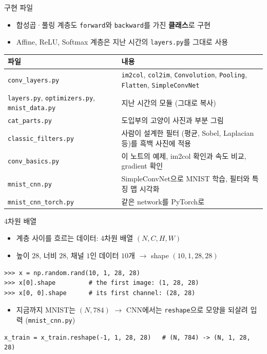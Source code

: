 \documentclass[aspectratio=169,11pt]{beamer}
\begin{document}
\begin{frame}{구현 파일}
\begin{itemize}
\item 합성곱·풀링 계층도 \texttt{forward}와 \texttt{backward}를 가진 \textbf{클래스}로 구현
\item Affine, ReLU, Softmax 계층은 지난 시간의 \texttt{layers.py}를 그대로 사용
\end{itemize}
\vskip2mm
\centering
\small
\begin{tabular}{@{}>{\raggedright\arraybackslash}p{}>{\raggedright\arraybackslash}p{}@{}}
\toprule
파일 & 내용 \\
\midrule
\texttt{conv\_layers.py} & \texttt{im2col}, \texttt{col2im}, \texttt{Convolution}, \texttt{Pooling}, \texttt{Flatten}, \texttt{SimpleConvNet} \\
\texttt{layers.py}, \texttt{optimizers.py}, \texttt{mnist\_data.py} & 지난 시간의 모듈 (그대로 복사) \\[2pt]
\texttt{cat\_parts.py} & 도입부의 고양이 사진과 부분 그림 \\
\texttt{classic\_filters.py} & 사람이 설계한 필터 (평균, Sobel, Laplacian 등)를 흑백 사진에 적용 \\
\texttt{conv\_basics.py} & 이 노트의 예제, im2col 확인과 속도 비교, gradient 확인 \\
\texttt{mnist\_cnn.py} & SimpleConvNet으로 MNIST 학습, 필터와 특징 맵 시각화 \\
\texttt{mnist\_cnn\_torch.py} & 같은 network를 PyTorch로 \\
\bottomrule
\end{tabular}
\end{frame}

\begin{frame}[fragile]{4차원 배열}
\begin{itemize}
\item 계층 사이를 흐르는 데이터: 4차원 배열 $(N,C,H,W)$
\item 높이 $28$, 너비 $28$, 채널 $1$인 데이터 $10$개 $\to$ shape $(10,1,28,28)$
\end{itemize}
\begin{lstlisting}[language={}]
>>> x = np.random.rand(10, 1, 28, 28)
>>> x[0].shape         # the first image: (1, 28, 28)
>>> x[0, 0].shape      # its first channel: (28, 28)
\end{lstlisting}
\begin{itemize}
\item 지금까지 MNIST는 $(N,784)$ $\to$ CNN에서는 \texttt{reshape}으로 모양을 되살려 입력 (\texttt{mnist\_cnn.py})
\end{itemize}
\begin{lstlisting}
x_train = x_train.reshape(-1, 1, 28, 28)   # (N, 784) -> (N, 1, 28, 28)
\end{lstlisting}
\end{frame}
\end{document}
